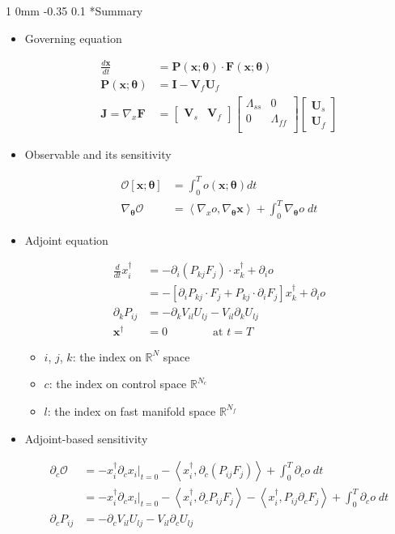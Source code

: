\documentclass[11pt]{article}
\makeatletter
\renewcommand{\subsection}{\@startsection
{subsection}%
{1}%
{0mm}%
{-0.35\baselineskip}%
{0.1\baselineskip}%
{\normalfont\large\bfseries\color{brown}}}%
\def\Dnorm#1#2{ \frac{d #1 }{ d #2} }
\newcommand\eqsp[2]{
\begin{equation#1}
\begin{split}
#2
\end{split}
\end{equation#1}
}
\newcommand{\cO}{\mathcal{O}}
\newcommand{\bx}{\mathbf{x}}
\newcommand{\bt}{\mathbf{\theta}}
\newcommand{\bI}{\mathbf{I}}
\newcommand{\bP}{\mathbf{P}}
\newcommand{\bF}{\mathbf{F}}
\newcommand{\bV}{\mathbf{V}}
\newcommand{\bU}{\mathbf{U}}
\newcommand{\bJ}{\mathbf{J}}
\newcommand{\inprod}[2]{\left\langle #1,#2 \right\rangle}
\makeatother
\begin{document}
\subsection*{Summary}
\begin{itemize}
\item Governing equation
\eqsp{}{
\Dnorm{\bx}{t} &= \bP(\bx;\bt)\cdot\bF(\bx;\bt)\\
\bP(\bx;\bt) &= \bI - \bV_f\bU_f\\
\bJ = \nabla_x\bF &= 
\begin{bmatrix}
\bV_s & \bV_f
\end{bmatrix}
\begin{bmatrix}
\Lambda_{ss} & 0 \\
0 & \Lambda_{ff} \\
\end{bmatrix}
\begin{bmatrix}
\bU_s \\
\bU_f
\end{bmatrix}
\label{g}
}
\item Observable and its sensitivity
\eqsp{}{
\cO[\bx;\bt] &= \int_0^T o(\bx;\bt) dt\\
\nabla_{\bt}\cO &= \inprod{\nabla_xo}{\nabla_{\bt}\bx} + \int_0^T \nabla_{\bt}o\;dt
\label{o}
}
\item Adjoint equation
\eqsp{}{
\Dnorm{}{t}x_i^{\dagger} &= - \partial_i\left( P_{kj}F_j \right)\cdot x_k^{\dagger} + \partial_io\\
&= - \left[ \partial_iP_{kj}\cdot F_j + P_{kj}\cdot\partial_iF_j \right]x_k^{\dagger} + \partial_io\\
\partial_kP_{ij} &= -\partial_kV_{il}U_{lj} - V_{il}\partial_kU_{lj}\\
\bx^{\dagger} &= 0\qquad\qquad \text{at }t=T
\label{adj}
}
\begin{itemize}
\item $i$, $j$, $k$: the index on $\mathbb{R}^N$ space
\item $c$: the index on control space $\mathbb{R}^{N_c}$
\item $l$: the index on fast manifold space $\mathbb{R}^{N_f}$
\end{itemize}
\item Adjoint-based sensitivity
\eqsp{}{
\partial_c\cO &= - x_i^{\dagger}\partial_cx_i\bigg|_{t=0}
- \inprod{x_i^{\dagger}}{\partial_c\left( P_{ij}F_j \right)}
+ \int_0^T \partial_co\;dt\\
&= - x_i^{\dagger}\partial_cx_i\bigg|_{t=0}
- \inprod{x_i^{\dagger}}{\partial_cP_{ij}F_j}
- \inprod{x_i^{\dagger}}{P_{ij}\partial_cF_j}
+ \int_0^T \partial_co\;dt\\
\partial_cP_{ij} &= -\partial_cV_{il}U_{lj} - V_{il}\partial_cU_{lj}
\label{adj_grad}
}
\end{itemize}
\end{document}
